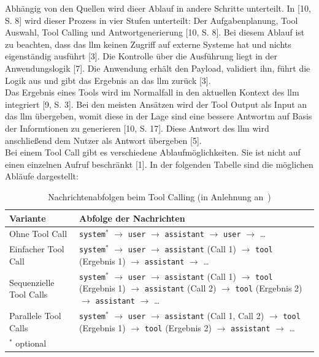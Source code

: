 Abhängig von den Quellen wird dieer Ablauf in andere Schritte unterteilt. In [10, S. 8] wird dieser Prozess in vier Stufen unterteilt: Der Aufgabenplanung, 
Tool Auswahl, Tool Calling und Antwortgenerierung [10, S. 8]. Bei diesem Ablauf ist zu beachten, dass das \ac{llm} keinen Zugriff auf externe Systeme hat und 
nichts eigenständig ausführt [3]. Die Kontrolle über die Ausführung liegt in der Anwendungslogik [7]. Die Anwendung erhält den Payload, validiert ihn, führt
die Logik aus und gibt das Ergebnis an das \ac{llm} zurück [3]. \\
Das Ergebnis eines Tools wird im Normalfall in den aktuellen Kontext des \ac{llm} integriert [9, S. 3]. Bei den meisten Ansätzen wird der Tool Output als 
Input an das \ac{llm} übergeben, womit diese in der Lage sind eine bessere Antwortm auf Basis der Informtionen zu generieren [10, S. 17]. Diese Antwort des 
\ac{llm} wird anschließend dem Nutzer als Antwort übergeben [5]. \\
Bei einem Tool Call gibt es verschiedene Ablaufmöglichkeiten. Sie ist nicht auf einen einzelnen Aufruf beschränkt [1]. In der folgenden Tabelle sind die 
möglichen Abläufe dargestellt: 

\begin{table}[htbp]
\centering
\caption{Nachrichtenabfolgen beim Tool Calling (in Anlehnung an~\cite{tc1})}
\label{tab:tool_calling_abfolgen}
\begin{tabularx}{\textwidth}{l X}
\toprule
\textbf{Variante} & \textbf{Abfolge der Nachrichten} \\
\midrule
Ohne Tool Call & \texttt{system}$^{*}$ $\rightarrow$ \texttt{user} $\rightarrow$ \texttt{assistant} $\rightarrow$ \texttt{user} $\rightarrow$ \dots \\
Einfacher Tool Call & \texttt{system}$^{*}$ $\rightarrow$ \texttt{user} $\rightarrow$ \texttt{assistant} (Call 1) $\rightarrow$ \texttt{tool} (Ergebnis 1) $\rightarrow$ \texttt{assistant} $\rightarrow$ \dots \\
Sequenzielle Tool Calls & \texttt{system}$^{*}$ $\rightarrow$ \texttt{user} $\rightarrow$ \texttt{assistant} (Call 1) $\rightarrow$ \texttt{tool} (Ergebnis 1) $\rightarrow$ \texttt{assistant} (Call 2) $\rightarrow$ \texttt{tool} (Ergebnis 2) $\rightarrow$ \texttt{assistant} $\rightarrow$ \dots \\
Parallele Tool Calls & \texttt{system}$^{*}$ $\rightarrow$ \texttt{user} $\rightarrow$ \texttt{assistant} (Call 1, Call 2) $\rightarrow$ \texttt{tool} (Ergebnis 1) $\rightarrow$ \texttt{tool} (Ergebnis 2) $\rightarrow$ \texttt{assistant} $\rightarrow$ \dots \\
\bottomrule
\multicolumn{2}{l}{\footnotesize $^{*}$ optional}
\end{tabularx}
\end{table}

